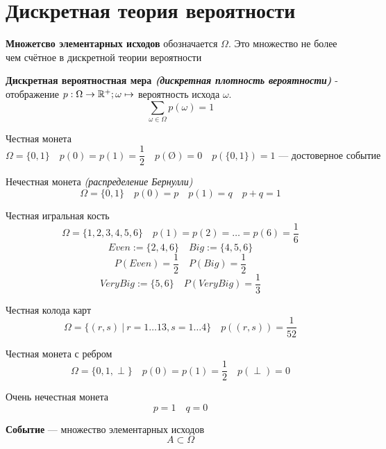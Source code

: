 

\cfoot{}



\section{Дискретная теория вероятности}

\begin{definition}
    \textbf{Множетсво элементарных исходов} обозначается $\Omega$. Это множество не более чем счётное в дискретной теории вероятности
\end{definition}
\begin{definition}
    \textbf{Дискретная вероятностная мера \textit{(дискретная плотность вероятности)}} - отображение $p: \Omega \to \mathbb{R}^+; \omega\mapsto$ вероятность исхода $\omega$. $$\sum\limits_{\omega\in\Omega} p(\omega) = 1$$
\end{definition}
\begin{example}
    Честная монета
    $$\Omega = \{0, 1\} \quad p(0) = p(1) = \frac{1}{2} \quad p(\text{\O})=0 \quad p(\{0, 1\})=1 \text{ --- достоверное событие}$$
\end{example}
\begin{example}
    Нечестная монета \textit{(распределение Бернулли)}
    $$\Omega = \{0, 1\} \quad p(0) = p \quad p(1) = q \quad p + q = 1$$
\end{example}
\begin{example}
    Честная игральная кость
    $$\Omega = \{1, 2, 3, 4, 5, 6\} \quad p(1) = p(2) = \ldots = p(6) = \frac{1}{6}$$
    $$Even := \{2, 4, 6\} \quad Big := \{4, 5, 6\}$$
    $$P(Even) = \frac{1}{2} \quad P(Big) = \frac{1}{2}$$
    $$VeryBig := \{5, 6\} \quad P(VeryBig) = \frac{1}{3}$$
\end{example}
\begin{example}
    Честная колода карт
    $$\Omega = \{(r, s)\ |\ r=1\ldots13, s=1\ldots4\} \quad p((r, s))=\frac{1}{52}$$
\end{example}
\begin{example}
    Честная монета с ребром
    $$\Omega = \{0, 1, \perp\} \quad p(0) = p(1) = \frac{1}{2} \quad p(\perp) = 0$$
\end{example}
\begin{example}
    Очень нечестная монета
    $$p = 1 \quad q = 0$$
\end{example}
\begin{definition}
    \textbf{Событие} --- множество элементарных исходов
    $$A\subset\Omega$$
\end{definition}
